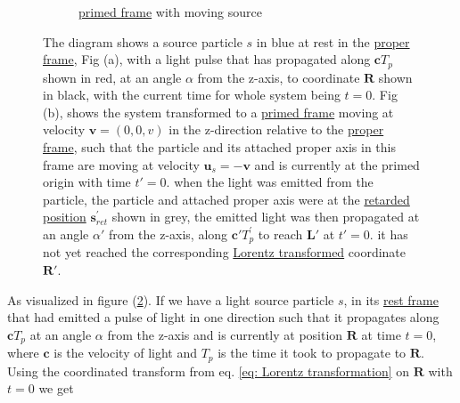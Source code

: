 \begin{figure}[H]
\begin{subfigure}{.49\textwidth}
		\caption{\hyperlink{def-Primed-Frame}{primed frame} with moving source}
		\label{fig: primed frame 1}
	\end{subfigure}
	\caption{The diagram shows a source particle $s$ in blue at rest in the \protect\hyperlink{def-proper-frame}{proper frame}, Fig (a), with a light pulse that has propagated along $\mathbf{c} {T}_{p}$ shown in red, at an angle $\alpha$ from the z-axis, to coordinate $\mathbf{R}$ shown in black, with the current time for whole system being $t=0$. Fig (b), shows the system transformed to a \protect\hyperlink{def-Primed-Frame}{primed frame} moving at velocity $\mathbf{v}=(0,0,v)$ in the z-direction relative to the \protect\hyperlink{def-proper-frame}{proper frame}, such that the particle and its attached proper axis in this frame are moving at velocity $\mathbf{u}_s= - \mathbf{v}$ and is currently at the primed origin with time $t{'}=0$. when the light was emitted from the particle, the particle and attached proper axis were at the \protect\hyperlink{def-retarded-position}{retarded position} $\mathbf{s}_{ret}^{'}$ shown in grey, the emitted light was then propagated at an angle $\alpha{'}$ from the z-axis, along $\mathbf{c}{'} {T}_{p}^{'}$ to reach $\mathbf{L}{'}$ at $t{'}=0$. it has not yet reached the corresponding \protect\hyperlink{def-lorentz-transform}{Lorentz transformed} coordinate $\mathbf{R}{'}$.}
	\label{fig: Retarded field outward field transform}
\end{figure}

As visualized in figure (\ref{fig: Retarded field outward field transform}).
If we have a light source particle $s$, in its \hyperlink{def-proper-frame}{rest frame} that had emitted a pulse of light in one direction such that it propagates along $\mathbf{c} {T}_{p}$ at an angle $\alpha$ from the z-axis and is currently at position $\mathbf{R}$ at time $t=0$, where $\mathbf{c}$ is the velocity of light and ${T}_{p}$ is the time it took to propagate to $\mathbf{R}$.
Using the coordinated transform from eq.
\eqref{eq: Lorentz transformation} on $\mathbf{R}$ with $t=0$ we get

